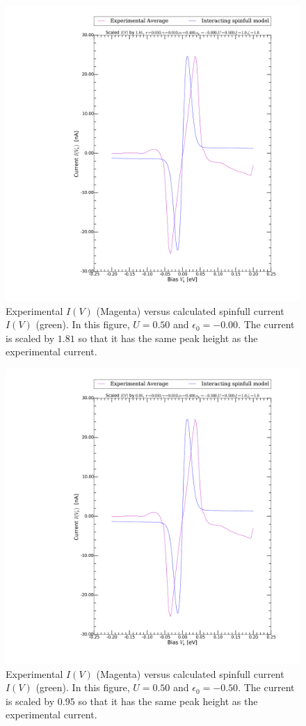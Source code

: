 \begin{figure}[h]
    \centering
    \includegraphics[width=.95\textwidth, clip=true, trim=11cm 2cm 2cm 0cm]{pdf/fit/fit_spinfull_2.pdf}
    \caption{Experimental $I(V)$ (Magenta) versus calculated spinfull current $I(V)$ (green). In this figure, $U=0.50$ and $\epsilon_0 = -0.00$. The current is scaled by $1.81$ so that it has the same peak height as the experimental current.}
    \label{fig:fitspinfull2}
\end{figure}
\begin{figure}[h]
    \centering
    \includegraphics[width=.95\textwidth, clip=true, trim=11cm 2cm 2cm 0cm]{pdf/fit/fit_spinfull_3.pdf}
    \caption{Experimental $I(V)$ (Magenta) versus calculated spinfull current $I(V)$ (green). In this figure, $U=0.50$ and $\epsilon_0 = -0.50$. The current is scaled by $0.95$ so that it has the same peak height as the experimental current.}
    \label{fig:fitspinfull3}
\end{figure}

